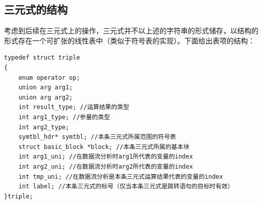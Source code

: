 \subsection{三元式的结构}
\label{triplestruct}
考虑到后续在三元式上的操作，三元式并不以上述的字符串的形式储存，以结构的形式存在一个可扩张的线性表中（类似于符号表的实现）。下面给出表项的结构：
\begin{lstlisting}
typedef struct triple
{
	enum operator op;
	union arg arg1;
	union arg arg2;
	int result_type; //运算结果的类型
	int arg1_type; //参量的类型
	int arg2_type; 
	symtbl_hdr* symtbl; //本条三元式所属范围的符号表
	struct basic_block *block; //本条三元式所属的基本块
	int arg1_uni; //在数据流分析时arg1所代表的变量的index
	int arg2_uni; //在数据流分析时arg2所代表的变量的index
	int tmp_uni; //在数据流分析是本条三元式运算结果代表的变量的index
	int label; //本条三元式的标号（仅当本条三元式是跳转语句的目标时有效）
}triple;
\end{lstlisting}

